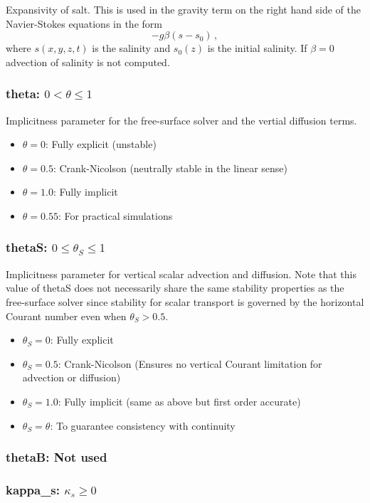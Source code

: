 \documentclass[12pt,oneside]{article}
\begin{document}
Expansivity of salt.  This is used in the gravity term on the right hand side of
the Navier-Stokes equations in the form
\[
-g\beta\left(s-s_0\right)\,,
\]
where $s(x,y,z,t)$ is the salinity and $s_0(z)$ is the initial salinity.  If $\beta=0$
advection of salinity is not computed.  


\subsubsection{theta: $0<\theta\le 1$}

Implicitness parameter for the free-surface solver and the vertial diffusion terms.
\begin{itemize}
\item $\theta=0$: Fully explicit (unstable)
\item $\theta=0.5$: Crank-Nicolson (neutrally stable in the linear sense)
\item $\theta=1.0$: Fully implicit
\item $\theta=0.55$: For practical simulations
\end{itemize}

\subsubsection{thetaS: $0\le \theta_S \le 1$}

Implicitness parameter for vertical scalar advection and diffusion.  Note that this
value of thetaS does not necessarily share the same stability properties as the
free-surface solver since stability for scalar transport is governed by
the horizontal Courant number even when $\theta_S>0.5$.
\begin{itemize}
\item $\theta_S=0$: Fully explicit 
\item $\theta_S=0.5$: Crank-Nicolson (Ensures no vertical Courant limitation for advection or diffusion)
\item $\theta_S=1.0$: Fully implicit (same as above but first order accurate)
\item $\theta_S=\theta$: To guarantee consistency with continuity 
\end{itemize}


\subsubsection{thetaB: Not used}

\subsubsection{kappa\_s: $\kappa_s\ge 0$}
\end{document}
